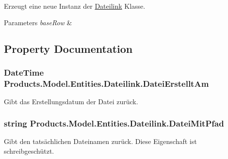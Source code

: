 Erzeugt eine neue Instanz der \hyperlink{class_products_1_1_model_1_1_entities_1_1_dateilink}{Dateilink} Klasse. 


\begin{DoxyParams}{Parameters}
{\em base\+Row} & \\
\hline
\end{DoxyParams}


\subsection{Property Documentation}
\subsubsection[{\texorpdfstring{Datei\+Erstellt\+Am}{DateiErstelltAm}}]{\setlength{\rightskip}{0pt plus 5cm}Date\+Time Products.\+Model.\+Entities.\+Dateilink.\+Datei\+Erstellt\+Am\hspace{0.3cm}{\ttfamily [get]}}\hypertarget{class_products_1_1_model_1_1_entities_1_1_dateilink_a2d2b11d47f11b272fb03e75f44638bba}{}\label{class_products_1_1_model_1_1_entities_1_1_dateilink_a2d2b11d47f11b272fb03e75f44638bba}


Gibt das Erstellungsdatum der Datei zurück. 

\subsubsection[{\texorpdfstring{Datei\+Mit\+Pfad}{DateiMitPfad}}]{\setlength{\rightskip}{0pt plus 5cm}string Products.\+Model.\+Entities.\+Dateilink.\+Datei\+Mit\+Pfad\hspace{0.3cm}{\ttfamily [get]}}\hypertarget{class_products_1_1_model_1_1_entities_1_1_dateilink_a34e2656f518d69df2c85434f981ab78c}{}\label{class_products_1_1_model_1_1_entities_1_1_dateilink_a34e2656f518d69df2c85434f981ab78c}


Gibt den tatsächlichen Dateinamen zurück. Diese Eigenschaft ist schreibgeschützt. 

